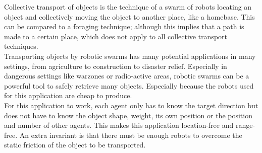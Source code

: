 
Collective transport of objects is the technique of a swarm of robots locating an object and collectively moving the object to another place, like a homebase. This can be compared to a foraging technique; although this implies that a path is made to a certain place, which does not apply to all collective transport techniques. \cite{Hoff2010}  \\
Transporting objects by robotic swarms has many potential applications in many settings, from agriculture to construction to disaster relief. Especially in dangerous settings like warzones or radio-active areas, robotic swarms can be a powerful tool to safely retrieve many objects. Especially because the robots used for this application are cheap to produce. \\
For this application to work, each agent only has to know the target direction but does not have to know the object shape, weight, its own position or the position and number of other agents. This makes this application location-free and range-free. An extra invariant is that there must be enough robots to overcome the static friction of the object to be transported.  \cite{Rubenstein}
